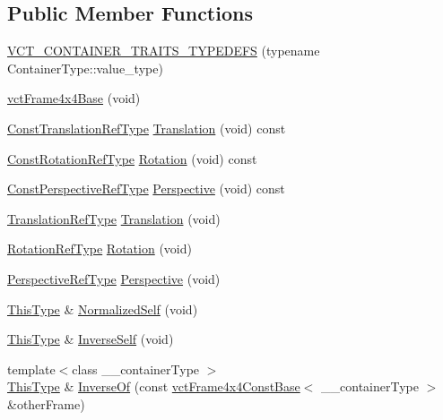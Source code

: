 \subsection*{Public Member Functions}
\begin{DoxyCompactItemize}
\item 
\hyperlink{classvct_frame4x4_base_aa75be9a8ceb761e82469ae8e682160ed}{V\+C\+T\+\_\+\+C\+O\+N\+T\+A\+I\+N\+E\+R\+\_\+\+T\+R\+A\+I\+T\+S\+\_\+\+T\+Y\+P\+E\+D\+E\+F\+S} (typename Container\+Type\+::value\+\_\+type)
\item 
\hyperlink{classvct_frame4x4_base_a6dd4d739de77628b08f596d3377079a2}{vct\+Frame4x4\+Base} (void)
\item 
\hyperlink{classvct_frame4x4_base_a720869bcd28db8ef2f9f13294097e99e}{Const\+Translation\+Ref\+Type} \hyperlink{classvct_frame4x4_base_ac5a213c0ecde1dd703ba43dfa949a3ae}{Translation} (void) const 
\item 
\hyperlink{classvct_frame4x4_base_a427cd6a2c5f48f68fde733a9b51a83e3}{Const\+Rotation\+Ref\+Type} \hyperlink{classvct_frame4x4_base_a4c3a4618f22eb091b192e13b086fe71c}{Rotation} (void) const 
\item 
\hyperlink{classvct_frame4x4_base_a47161d0a7598341722759640af9413e5}{Const\+Perspective\+Ref\+Type} \hyperlink{classvct_frame4x4_base_af316050673cbf0d655aadc37af5f1014}{Perspective} (void) const 
\item 
\hyperlink{classvct_frame4x4_base_a0450063a4ebdf0f0c87c7f3fa789a17f}{Translation\+Ref\+Type} \hyperlink{classvct_frame4x4_base_a01cb309043ca7c26e8161e634603824e}{Translation} (void)
\item 
\hyperlink{classvct_frame4x4_base_a57cec1ba52b9787d77da60fb020c1999}{Rotation\+Ref\+Type} \hyperlink{classvct_frame4x4_base_a16eca5fb18cb4a73f54f1694f019d57d}{Rotation} (void)
\item 
\hyperlink{classvct_frame4x4_base_a445582cef7ba9f03553b1d9e63a2d64c}{Perspective\+Ref\+Type} \hyperlink{classvct_frame4x4_base_a226f75f603ddd25a970c145b7eb3b0df}{Perspective} (void)
\item 
\hyperlink{classvct_frame4x4_base_af6dcf167c0c3965872a095ce28853598}{This\+Type} \& \hyperlink{classvct_frame4x4_base_a4f7e738185921ab11a5c4db9e9d05ecc}{Normalized\+Self} (void)
\item 
\hyperlink{classvct_frame4x4_base_af6dcf167c0c3965872a095ce28853598}{This\+Type} \& \hyperlink{classvct_frame4x4_base_a7d9a54234186c138b4d09aa9577da2e8}{Inverse\+Self} (void)
\item 
{\footnotesize template$<$class \+\_\+\+\_\+container\+Type $>$ }\\\hyperlink{classvct_frame4x4_base_af6dcf167c0c3965872a095ce28853598}{This\+Type} \& \hyperlink{classvct_frame4x4_base_ae11e6b69c6bc550c261d2c117aba013c}{Inverse\+Of} (const \hyperlink{classvct_frame4x4_const_base}{vct\+Frame4x4\+Const\+Base}$<$ \+\_\+\+\_\+container\+Type $>$ \&other\+Frame)
\end{DoxyCompactItemize}
